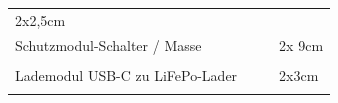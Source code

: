 \documentclass[
]{article}
\begin{document}
\begin{longtable}[]{@{}llll@{}}
\begin{minipage}[t]{0.22\columnwidth}
{2x2,5cm}\strut
\end{minipage}\tabularnewline
\begin{minipage}[t]{0.22\columnwidth}\raggedright
{Schutzmodul-Schalter / Masse}\strut
\end{minipage} & \begin{minipage}[t]{0.22\columnwidth}\raggedright
{}\strut
\end{minipage} & \begin{minipage}[t]{0.22\columnwidth}\raggedright
{}\strut
\end{minipage} & \begin{minipage}[t]{0.22\columnwidth}\raggedright
{2x 9cm}\strut
\end{minipage}\tabularnewline
\begin{minipage}[t]{0.22\columnwidth}\raggedright
{}\strut
\end{minipage} & \begin{minipage}[t]{0.22\columnwidth}\raggedright
{}\strut
\end{minipage} & \begin{minipage}[t]{0.22\columnwidth}\raggedright
{}\strut
\end{minipage} & \begin{minipage}[t]{0.22\columnwidth}\raggedright
{}\strut
\end{minipage}\tabularnewline
\begin{minipage}[t]{0.22\columnwidth}\raggedright
{Lademodul USB-C zu LiFePo-Lader}\strut
\end{minipage} & \begin{minipage}[t]{0.22\columnwidth}\raggedright
{}\strut
\end{minipage} & \begin{minipage}[t]{0.22\columnwidth}\raggedright
{}\strut
\end{minipage} & \begin{minipage}[t]{0.22\columnwidth}\raggedright
{2x3cm}\strut
\end{minipage}\tabularnewline
\begin{minipage}[t]{0.22\columnwidth}\raggedright
{}\strut
\end{minipage} & \begin{minipage}[t]{0.22\columnwidth}\raggedright
{}\strut
\end{minipage} & \begin{minipage}[t]{0.22\columnwidth}\raggedright
{}\strut
\end{minipage} & \begin{minipage}[t]{0.22\columnwidth}\raggedright

\end{minipage}
\end{longtable}
\end{document}

